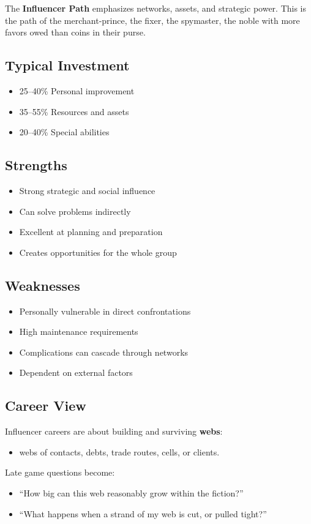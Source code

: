 The \textbf{Influencer Path} emphasizes networks, assets, and strategic power.
This is the path of the merchant-prince, the fixer, the spymaster, the noble
with more favors owed than coins in their purse.

\subsection*{Typical Investment}
\begin{itemize}
\item 25--40\% Personal improvement
\item 35--55\% Resources and assets
\item 20--40\% Special abilities
\end{itemize}

\subsection*{Strengths}
\begin{itemize}
\item Strong strategic and social influence
\item Can solve problems indirectly
\item Excellent at planning and preparation
\item Creates opportunities for the whole group
\end{itemize}

\subsection*{Weaknesses}
\begin{itemize}
\item Personally vulnerable in direct confrontations
\item High maintenance requirements
\item Complications can cascade through networks
\item Dependent on external factors
\end{itemize}

\subsection*{Career View}

Influencer careers are about building and surviving \textbf{webs}:
\begin{itemize}
  \item webs of contacts, debts, trade routes, cells, or clients.
\end{itemize}
Late game questions become:
\begin{itemize}
  \item ``How big can this web reasonably grow within the fiction?''
  \item ``What happens when a strand of my web is cut, or pulled tight?''
\end{itemize}

